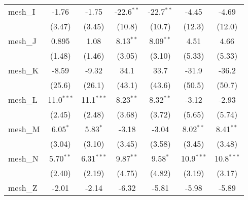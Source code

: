 \begin{tabular}{lcccccc}
   mesh\_I                                                     & -1.76          & -1.75          & -22.6$^{**}$  & -22.7$^{**}$  & -4.45          & -4.69\\   
                                                               & (3.47)         & (3.45)         & (10.8)        & (10.7)        & (12.3)         & (12.0)\\   
   mesh\_J                                                     & 0.895          & 1.08           & 8.13$^{**}$   & 8.09$^{**}$   & 4.51           & 4.66\\   
                                                               & (1.48)         & (1.46)         & (3.05)        & (3.10)        & (5.33)         & (5.33)\\   
   mesh\_K                                                     & -8.59          & -9.32          & 34.1          & 33.7          & -31.9          & -36.2\\   
                                                               & (25.6)         & (26.1)         & (43.1)        & (43.6)        & (50.5)         & (50.7)\\   
   mesh\_L                                                     & 11.0$^{***}$   & 11.1$^{***}$   & 8.23$^{**}$   & 8.32$^{**}$   & -3.12          & -2.93\\   
                                                               & (2.45)         & (2.48)         & (3.68)        & (3.72)        & (5.65)         & (5.74)\\   
   mesh\_M                                                     & 6.05$^{*}$     & 5.83$^{*}$     & -3.18         & -3.04         & 8.02$^{**}$    & 8.41$^{**}$\\   
                                                               & (3.04)         & (3.10)         & (3.45)        & (3.58)        & (3.45)         & (3.48)\\   
   mesh\_N                                                     & 5.70$^{**}$    & 6.31$^{***}$   & 9.87$^{**}$   & 9.58$^{*}$    & 10.9$^{***}$   & 10.8$^{***}$\\   
                                                               & (2.40)         & (2.19)         & (4.75)        & (4.82)        & (3.19)         & (3.17)\\   
   mesh\_Z                                                     & -2.01          & -2.14          & -6.32         & -5.81         & -5.98          & -5.89\\   

\end{tabular}
